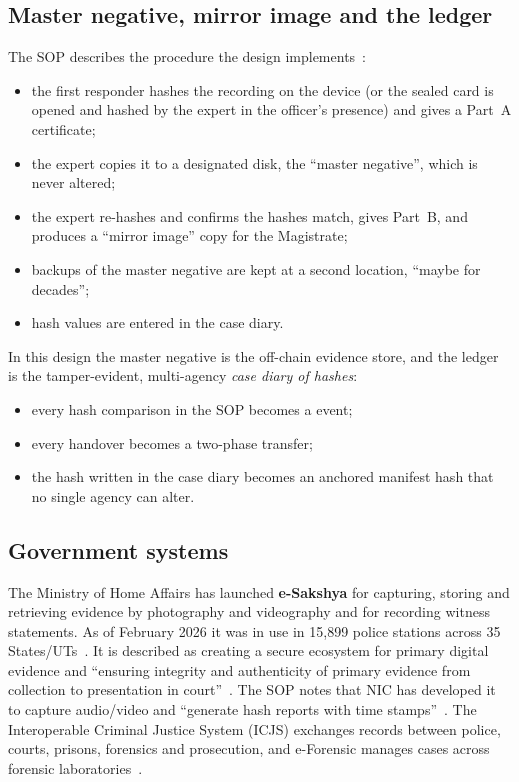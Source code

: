 \subsection{Master negative, mirror image and the ledger}
The SOP describes the procedure the design implements~\cite{sopbnss}:
\begin{itemize}
  \item the first responder hashes the recording on the device (or the sealed card is opened and hashed by the expert in the officer's presence) and gives a Part~A certificate;
  \item the expert copies it to a designated disk, the \enquote{master negative}, which is never altered;
  \item the expert re-hashes and confirms the hashes match, gives Part~B, and produces a \enquote{mirror image} copy for the Magistrate;
  \item backups of the master negative are kept at a second location, \enquote{maybe for decades};
  \item hash values are entered in the case diary.
\end{itemize}

In this design the master negative is the off-chain evidence store, and the ledger is the tamper-evident, multi-agency \emph{case diary of hashes}:
\begin{itemize}
  \item every hash comparison in the SOP becomes a  event;
  \item every handover becomes a two-phase transfer;
  \item the hash written in the case diary becomes an anchored manifest hash that no single agency can alter.
\end{itemize}

\subsection{Government systems}
The Ministry of Home Affairs has launched \textbf{e-Sakshya} for capturing, storing and retrieving evidence by photography and videography and for recording witness statements. As of February 2026 it was in use in 15{,}899 police stations across 35 States/UTs~\cite{rs1332}. It is described as creating a secure ecosystem for primary digital evidence and \enquote{ensuring integrity and authenticity of primary evidence from collection to presentation in court}~\cite{pib2026}. The SOP notes that NIC has developed it to capture audio/video and \enquote{generate hash reports with time stamps}~\cite{sopbnss}. The Interoperable Criminal Justice System (ICJS) exchanges records between police, courts, prisons, forensics and prosecution, and e-Forensic manages cases across forensic laboratories~\cite{pib2026}.

